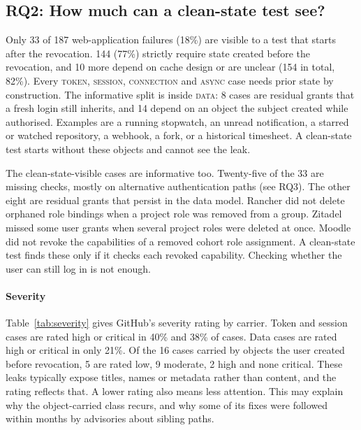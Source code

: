 \documentclass[preprint,12pt]{elsarticle}
\begin{document}
\begin{table}[t]
\centering\small
\caption{Carrier by clean-state visibility (web applications).}
\label{tab:carrier}

\end{table}

\subsection{RQ2: How much can a clean-state test see?}
Only 33 of 187 web-application failures (18\%) are visible to a test that starts after the revocation.
144 (77\%) strictly require state created before the revocation, and 10 more depend on cache design or are
unclear (154 in total, 82\%).
Every \textsc{token}, \textsc{session}, \textsc{connection} and \textsc{async} case needs prior state by
construction. The informative split is inside \textsc{data}: 8 cases are residual grants that a fresh
login still inherits, and 14 depend on an object the subject created while authorised. Examples are a running
stopwatch, an unread notification, a starred or watched repository, a webhook, a fork, or a historical
timesheet. A clean-state test starts without these objects and cannot see the leak.

The clean-state-visible cases are informative too. Twenty-five of the 33 are missing checks, mostly on alternative
authentication paths (see RQ3). The other eight are residual grants that persist in the data model. Rancher did not
delete orphaned role bindings when a project role was removed from a group. Zitadel missed some user grants when several
project roles were deleted at once. Moodle did not revoke the capabilities of a removed cohort role assignment. A
clean-state test finds these only if it checks each revoked capability. Checking whether the user can still log in is not enough.

\paragraph{Severity}
Table~\ref{tab:severity} gives GitHub's severity rating by carrier. Token and session cases are rated high or critical in
40\% and 38\% of cases. Data cases are rated high or critical in only 21\%. Of the 16 cases carried by objects the user
created before revocation, 5 are rated low, 9 moderate, 2 high and none critical. These leaks typically expose
titles, names or metadata rather than content, and the rating reflects that. A lower rating also means less
attention. This may explain why the object-carried class recurs, and why some of its fixes were followed within months by
advisories about sibling paths.
\end{document}
